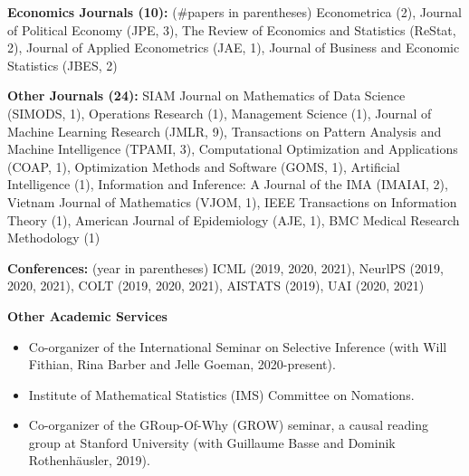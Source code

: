 \documentclass{article}
\begin{document}
\vspace{2mm}
\noindent \textbf{Economics Journals (10): }(\#papers in parentheses) Econometrica (2), Journal of Political Economy (JPE, 3), The Review of Economics and Statistics (ReStat, 2), Journal of Applied Econometrics (JAE, 1), Journal of Business and Economic Statistics (JBES, 2)

\vspace{2mm}
\noindent \textbf{Other Journals (24): } SIAM Journal on Mathematics of Data Science (SIMODS, 1), Operations Research (1), Management Science (1), Journal of Machine Learning Research (JMLR, 9), Transactions on Pattern Analysis and Machine Intelligence (TPAMI, 3), Computational Optimization and Applications (COAP, 1), Optimization Methods and Software (GOMS, 1), Artificial Intelligence (1), Information and Inference: A Journal of the IMA (IMAIAI, 2), Vietnam Journal of Mathematics (VJOM, 1), IEEE Transactions on Information Theory (1), American Journal of Epidemiology (AJE, 1), BMC Medical Research Methodology (1)

\vspace{2mm}
\noindent \textbf{Conferences: }(year in parentheses) ICML (2019, 2020, 2021), NeurlPS (2019, 2020, 2021), COLT (2019, 2020, 2021), AISTATS (2019), UAI (2020, 2021)

\vspace{7mm}
\begin{large}
\noindent \textbf{Other Academic Services}
\end{large}

\begin{itemize}
\item Co-organizer of the International Seminar on Selective Inference (with Will Fithian, Rina Barber and Jelle Goeman, 2020-present).
\item Institute of Mathematical Statistics (IMS) Committee on Nomations.
\item Co-organizer of the GRoup-Of-Why (GROW) seminar, a causal reading group at Stanford University (with Guillaume Basse and Dominik Rothenhäusler, 2019).
\end{itemize}
\end{document}
